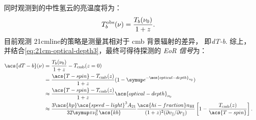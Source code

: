 同时观测到的中性氢云的亮温度将为：
\begin{equation}
  T_b^{\mathrm{obs}}(\nu) = \frac{T_b(\nu_0)}{1 + z} .
\end{equation}
目前观测 \ac{21cmline}的策略是测量其相对于 \ac{cmb} 背景辐射的差异，
即\emph{\acf{dT-b}}.
综上，并结合\autoref{eq:21cm-optical-depth3}，最终可得待探测的 \emph{EoR 信号}为：
\begin{align}
  \acs{dT-b}(\nu)
    & = \frac{T_b(\nu_0)}{1 + z} - T_{\R{cmb}}(z=0)  \\
    & = \frac{\acs{T-spin} - T_{\R{cmb}}(z)}{1+z}
      (1 - \Ce^{-\acs{optical-depth}_{\nu_0}})  \\
    & \approx \frac{\acs{T-spin} - T_{\R{cmb}}(z)}{1+z}
      \acs{optical-depth}_{\nu_0}  \\
    & \approx \frac{3 \acs{hp} \acs{speed-light}^3 A_{21}}{
      32\Cpi \nu_0^2 \,\acs{kb}}
      \frac{\acs{hi-fraction} n_{\R{HI}}}{
        (1+z)^2 (\partial v_{\parallel} / \partial r_{\parallel})}
      \left[ 1 - \frac{T_{\R{cmb}}(z)}{\acs{T-spin}} \right] .
    \label{eq:eor-signal1}
\end{align}

